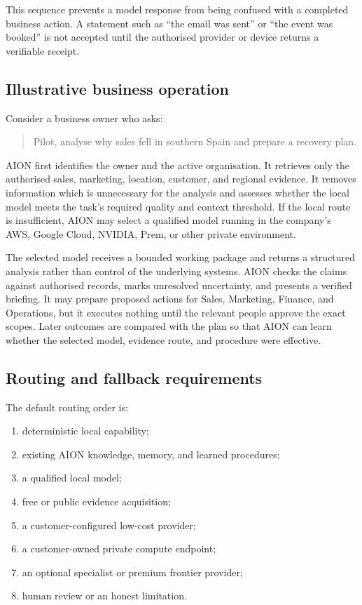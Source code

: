 This sequence prevents a model response from being confused with a completed
business action.  A statement such as ``the email was sent'' or ``the event was
booked'' is not accepted until the authorised provider or device returns a
verifiable receipt.

\subsection{Illustrative business operation}

Consider a business owner who asks:

\begin{quote}
Pilot, analyse why sales fell in southern Spain and prepare a recovery plan.
\end{quote}

AION first identifies the owner and the active organisation.  It retrieves only
the authorised sales, marketing, location, customer, and regional evidence.  It
removes information which is unnecessary for the analysis and assesses whether
the local model meets the task's required quality and context threshold.  If the
local route is insufficient, AION may select a qualified model running in the
company's AWS, Google Cloud, NVIDIA, Prem, or other private environment.

The selected model receives a bounded working package and returns a structured
analysis rather than control of the underlying systems.  AION checks the claims
against authorised records, marks unresolved uncertainty, and presents a
verified briefing.  It may prepare proposed actions for Sales, Marketing,
Finance, and Operations, but it executes nothing until the relevant people
approve the exact scopes.  Later outcomes are compared with the plan so that
AION can learn whether the selected model, evidence route, and procedure were
effective.

\subsection{Routing and fallback requirements}

The default routing order is:

\begin{enumerate}
  \item deterministic local capability;
  \item existing AION knowledge, memory, and learned procedures;
  \item a qualified local model;
  \item free or public evidence acquisition;
  \item a customer-configured low-cost provider;
  \item a customer-owned private compute endpoint;
  \item an optional specialist or premium frontier provider;
  \item human review or an honest limitation.
\end{enumerate}

